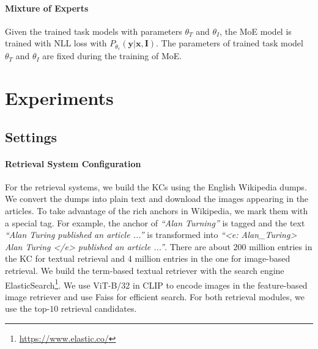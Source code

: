 \documentclass[11pt]{article}
\def\vx{{\bm{x}}}
\def\vy{{\bm{y}}}
\def\mI{{\bm{I}}}
\begin{document}
\paragraph{Mixture of Experts} Given the trained task models with parameters ${\theta_{T}}$ and ${\theta_{I}}$, the MoE model is trained with NLL loss with $P_{\theta_c}(\vy|\vx,\mI)$. The parameters of trained task model ${\theta_{T}}$ and ${\theta_{I}}$ are fixed during the training of MoE.

\section{Experiments}


\subsection{Settings}
\paragraph{Retrieval System Configuration}
For the retrieval systems, we build the KCs using the English Wikipedia dumps. We convert the dumps into plain text and download the images appearing in the articles. To take advantage of the rich anchors in Wikipedia, we mark them with a special tag. For example, the anchor of \textit{``Alan Turning''} is tagged and the text \textit{``Alan Turing published an article ...''} is transformed into \textit{``<e: Alan\_Turing> Alan Turing </e> published an article ...''}. There are about 200 million entries in the KC for textual retrieval and 4 million entries in the one for image-based retrieval. We build the term-based textual retriever with the search engine ElasticSearch\footnote{\url{https://www.elastic.co/}}. We use ViT-B/32 in CLIP to encode images in the feature-based image retriever and use Faiss \cite{johnson2019billion} for efficient search. For both retrieval modules, we use the top-$10$ retrieval candidates.
\end{document}
